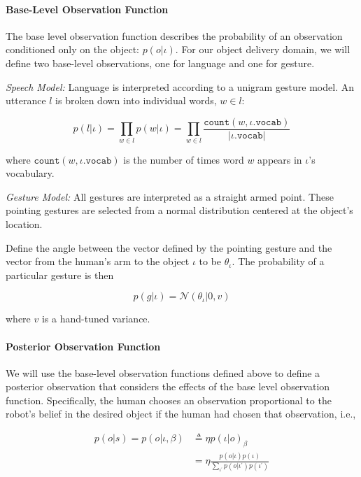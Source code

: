 \documentclass{article}
\begin{document}
\paragraph{Base-Level Observation Function}

The base level observation function describes the probability of an observation conditioned only on the object: $p(o|\iota)$. For our object delivery domain, we will define two base-level observations, one for language and one for gesture. 

\noindent\textit{Speech Model:} Language is interpreted according to a unigram gesture model. An utterance $l$ is broken down into individual words, $w \in l$: 

\begin{equation}
	p(l|\iota) = \prod_{w \in l} p(w|\iota) = \prod_{w\in l} \frac{\texttt{count}(w, \iota.\texttt{vocab})}{|\iota.\texttt{vocab}|}
\end{equation}

where $\texttt{count}(w, \iota.\texttt{vocab})$ is the number of times word $w$ appears in $\iota$'s vocabulary. 

\noindent\textit{Gesture Model:} All gestures are interpreted as a straight armed point. These pointing gestures are selected from a normal distribution centered at the object's location. 

Define the angle between the vector defined by the pointing gesture and the vector from the human's arm to the object $\iota$ to be $\theta_\iota$. The probability of a particular gesture is then

\begin{equation}
p(g|\iota) = \mathcal{N}(\theta_\iota | 0, v)
\end{equation}

where $v$ is a hand-tuned variance. 

\paragraph{Posterior Observation Function}

We will use the base-level observation functions defined above to define a posterior observation that considers the effects of the base level observation function. Specifically, the human chooses an observation proportional to the robot's belief in the desired object if the human had chosen that observation, i.e., 

\begin{align}
p(o|s) = p(o|\iota, \beta) &\triangleq \eta p(\iota|o)_\beta \\
&= \eta \frac{p(o|\iota) p(\iota)}{\sum_{\iota^\prime} p(o|\iota^\prime)p(\iota^\prime)} 
\end{align}
\end{document}
